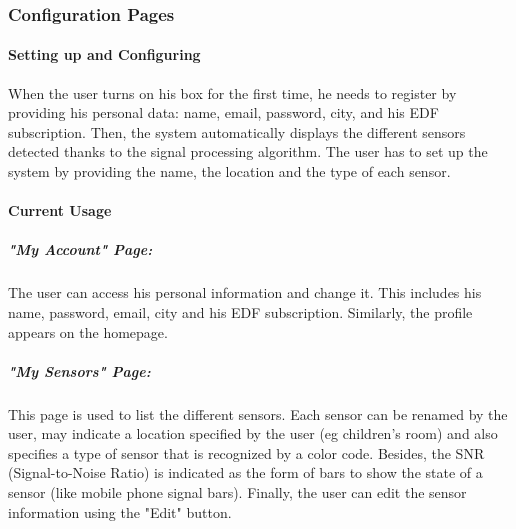 \subsubsection{Configuration Pages}
    
    \paragraph{Setting up and Configuring} %
    
    When the user turns on his box for the first time, he needs to register by providing his personal data: name, email, password, city, and his EDF subscription. Then, the system automatically displays the different sensors detected thanks to the signal processing algorithm. The user has to set up the system by providing the name, the location and the type of each sensor. %
    
    \paragraph{Current Usage} %
    
    \subparagraph{"My Account" Page:} 
    The user can access his personal information and change it. This includes his name, password, email, city and his EDF subscription. Similarly, the profile appears on the homepage.
    
    \subparagraph{"My Sensors" Page:}
    This page is used to list the different sensors. Each sensor can be renamed by the user, may indicate a location specified by the user (eg children's room) and also specifies a type of sensor that is recognized by a color code. Besides, the SNR (Signal-to-Noise Ratio) is indicated as the form of bars to show the state of a sensor (like mobile phone signal bars). Finally, the user can edit the sensor information using the "Edit" button.